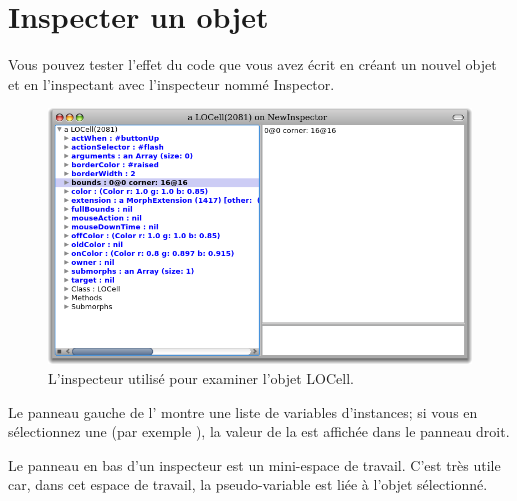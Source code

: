 \documentclass[a4paper,10pt,twoside]{book}
\begin{document}
\section{Inspecter un objet}

Vous pouvez tester l'effet du code que vous avez écrit en créant un
nouvel objet  et en l'inspectant avec l'inspecteur nommé Inspector.

\begin{figure}[htbp]
   \centering
   \includegraphics[width=\textwidth]{LOCellInspector} 
   \caption{L'inspecteur utilisé pour examiner l'objet LOCell.}
\end{figure}

Le panneau gauche de l' montre une liste de variables
d'instances; si vous en sélectionnez une (par exemple
\mbox{),} la valeur de la  est
affichée dans le panneau droit. %


Le panneau en bas d'un inspecteur est un mini-espace de
travail. C'est très utile car, dans cet espace de travail, la
  pseudo-variable \self{} est liée à l'objet sélectionné.
\end{document}
